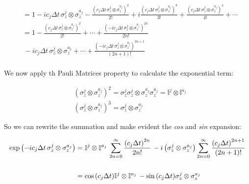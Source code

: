 \documentclass[a4paper,12pt]{article}
\begin{document}
	\begin{align*}
		&= 1 - i c_j \Delta t \, \sigma_{z}^{j} \otimes \sigma_{z}^{a_j} - \frac{\left( c_j \Delta t \, \sigma_{z}^{j} \otimes \sigma_{z}^{a_j} \right)^2}{2!} + i \frac{\left( c_j \Delta t \, \sigma_{z}^{j} \otimes \sigma_{z}^{a_j} \right)^3}{3!} + \frac{\left( c_j \Delta t \, \sigma_{z}^{j} \otimes \sigma_{z}^{a_j} \right)^4}{4!} + \cdots  \\
		&=1 - \frac{\left( c_j \Delta t \, \sigma_{z}^{j} \otimes \sigma_{z}^{a_j} \right)^2}{2!} + \cdots  + \frac{\left( -i c_j \Delta t \, \sigma_{z}^{j} \otimes \sigma_{z}^{a_j} \right)^{{2n}}}{2n!}  \\
		&\,- i c_j\Delta t \, \sigma_{z}^{j} \otimes \sigma_{z}^{a_j} + \cdots  + \frac{\left( -i c_j \Delta t \, \sigma_{z}^{j} \otimes \sigma_{z}^{a_j} \right)^{{2n+1}}}{(2n+1)!} \\ 
	\end{align*}

	\begin{flushleft}
		We now apply th Pauli Matrices property to calculate the exponential term: 
	\end{flushleft}
	
	\begin{equation}
	\begin{aligned}
		&\left(\sigma_{z}^{j} \otimes \sigma_{z}^{a_j} \right)^{2} = \sigma_{z}^{j} \sigma_{z}^{j} \otimes \sigma_{z}^{a_j} \sigma_{z}^{a_j} = \mathbb{I}^{j} \otimes \mathbb{I}^{a_j} \\
		&\left(\sigma_{z}^{j} \otimes \sigma_{z}^{a_j} \right)^{3} = \sigma_{z}^{j} \otimes \sigma_{z}^{a_j}
	\end{aligned}
	\end{equation}

	\begin{flushleft}
		So we can rewrite the summation and make evident the \textit{cos} and \textit{sin} expansion:
	\end{flushleft}
	 
	\begin{align}
		\exp{\left( -i c_j \Delta t \, \sigma_{z}^{j} \otimes \sigma_{z}^{a_j} \right)} &=\mathbb{I}^{j} \otimes \mathbb{I}^{a_j} \, \sum_{2n=0}^{\infty}
		{ \frac{\left( c_j \Delta t \right)^{{2n}}}{2n!} } \,  - i \left(\sigma_{z}^{j} \otimes \sigma_{z}^{a_j} \right) \sum_{2n=0}^{\infty}{ \frac{\left( c_j \Delta t  \right)^{{2n+1}}}{(2n+1)!} } \notag \\
		\notag \\	
		&= \cos{\left(c_j \Delta t\right)} \mathbb{I}^{j} \otimes \mathbb{I}^{a_j} \, - \sin{\left(c_j \Delta t \right)} \sigma_{z}^{j} \otimes \sigma_{z}^{a_j}
	\end{align}
	
\end{document}
